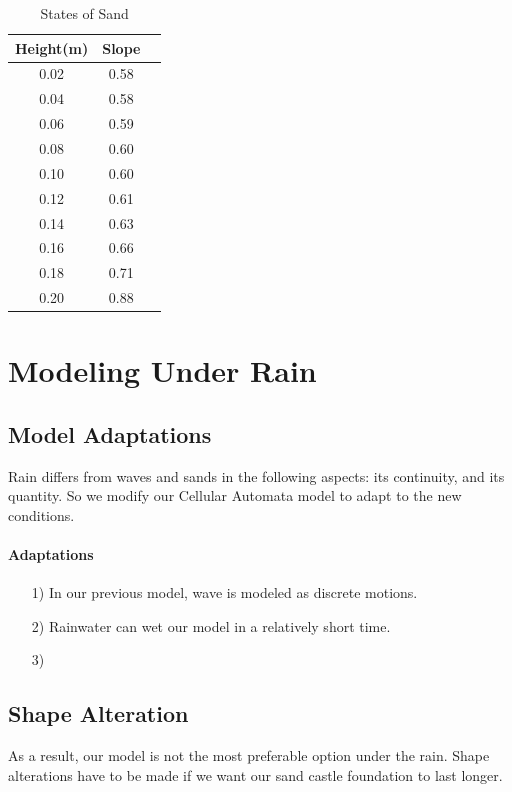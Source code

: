\documentclass[12pt]{article}
\begin{document}
\begin{table}[H]
    \caption{States of Sand}
    \vspace{10pt}
    \centering
    \begin{tabular}{ccc}
        \hline
        Height(m) & Slope \\
        \hline
        0.02      & 0.58  \\
        0.04      & 0.58  \\
        0.06      & 0.59  \\
        0.08      & 0.60  \\
        0.10      & 0.60  \\
        0.12      & 0.61  \\
        0.14      & 0.63  \\
        0.16      & 0.66  \\
        0.18      & 0.71  \\
        0.20      & 0.88  \\
        \hline
    \end{tabular}
    \label{bs2}
\end{table}
\section{Modeling Under Rain}
\subsection{Model Adaptations}
Rain differs from waves and sands in the following aspects: its continuity, and its quantity. So we modify our Cellular Automata model to adapt to the new conditions.
\paragraph{Adaptations}
\begin{itemize}
    \item [1)]
          In our previous model, wave is modeled as discrete motions.
    \item [2)]
          Rainwater can wet our model in a relatively short time.
    \item [3)]

\end{itemize}
\subsection{Shape Alteration}
As a result, our model is not the most preferable option under the rain. Shape alterations have to be made if we want our sand castle foundation to last longer.
\end{document}

